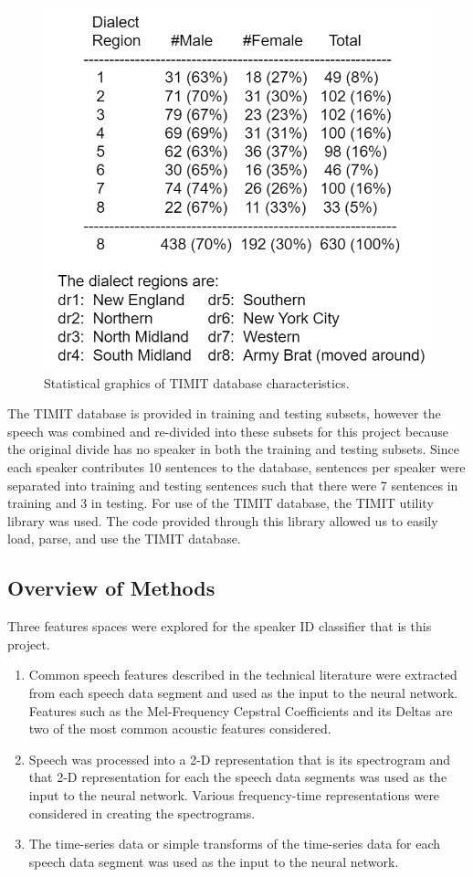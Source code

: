 \documentclass{article}
\begin{document}
\begin{figure}[h!]
  \includegraphics[scale=0.35]{speaker_dist.png}
  \caption{Statistical graphics of TIMIT database characteristics.}
  \label{fig:timit_graphics}
\end{figure}
The TIMIT database is provided in training and testing subsets, however the speech was combined and re-divided into these subsets for this project because the original divide has no speaker in both the training and testing subsets.
Since each speaker contributes 10 sentences to the database, sentences per speaker were separated into training and testing sentences such that there were 7 sentences in training and 3 in testing. \cite{TIMIT}
For use of the TIMIT database, the TIMIT utility library was used. The code provided through this library allowed us to easily load, parse, and use the TIMIT database. \cite{TIMIT_Utils}
\subsection{Overview of Methods}
Three features spaces were explored for the speaker ID classifier that is this project.
\begin{enumerate}
  \item Common speech features described in the technical literature were extracted from each speech data segment and used as the input to the neural network. Features such as the Mel-Frequency Cepstral Coefficients and its Deltas are two of the most common acoustic features considered.
  \item Speech was processed into a 2-D representation that is its spectrogram and that 2-D representation for each the speech data segments was used as the input to the neural network. Various frequency-time representations were considered in creating the spectrograms.
  \item The time-series data or simple transforms of the time-series data for each speech data segment was used as the input to the neural network.
\end{enumerate}
\end{document}
